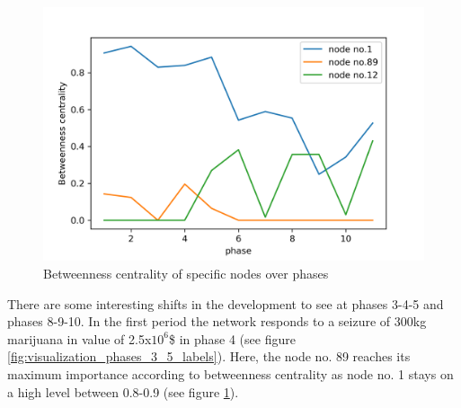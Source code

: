 \begin{figure}[htbp]
	\centering
	\includegraphics[width=0.7\linewidth]{problem_02/betweenness_specific_nodes}
	\caption{Betweenness centrality of specific nodes over phases}
	\label{fig:betweenness_specific_nodes}
\end{figure}

There are some interesting shifts in the development to see at phases 3-4-5 and phases 8-9-10. In the first period the network responds to a seizure of 300kg marijuana in value of 2.5x$10^6$\$ in phase 4 (see figure \ref{fig:visualization_phases_3_5_labels}). Here, the node no. 89 reaches its maximum importance according to betweenness centrality as node no. 1 stays on a high level between 0.8-0.9 (see figure \ref{fig:betweenness_specific_nodes}).\\

